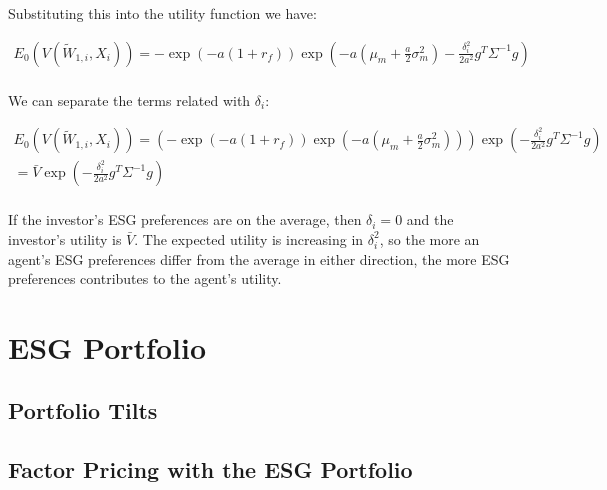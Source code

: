 Substituting this into the utility function we have:

\begin{equation}
    \begin{aligned}
        E_0(V(\tilde{W}_{1,i}, X_i)) = -\exp{(-a(1 + r_f))} \exp{(-a(\mu_m + \frac{a}{2}\sigma^2_m) - \frac{\delta_i^2}{2a^2}g^T \Sigma^{-1} g)} \\
    \end{aligned}
\end{equation}

We can separate the terms related with $\delta_i$: 

\begin{equation}
    \begin{aligned}
        E_0(V(\tilde{W}_{1,i}, X_i)) = (-\exp{(-a(1 + r_f))} \exp{(-a(\mu_m + \frac{a}{2}\sigma^2_m))}) \exp{(-\frac{\delta_i^2}{2a^2}g^T \Sigma^{-1} g)} \\
        = \bar{V} \exp{(-\frac{\delta_i^2}{2a^2}g^T \Sigma^{-1} g)} \\
    \end{aligned}
\end{equation}

If the investor's ESG preferences are on the average, then $\delta_i = 0$ and
the investor's utility is $\bar{V}$. The expected utility 
is increasing in $\delta_i^2$, so the more an agent's ESG preferences 
differ from the average in either direction, the more ESG preferences
contributes to the agent's utility.

\section{ESG Portfolio}

\subsection{Portfolio Tilts}


\subsection{Factor Pricing with the ESG Portfolio}